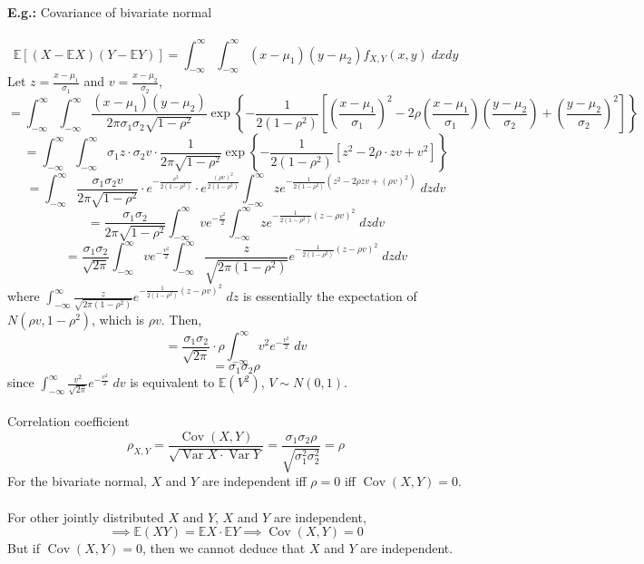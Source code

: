 \documentclass[a4paper]{article}
\newcommand{\n}{\hfill\break}
\newcommand{\eg}[1]{\par\noindent\settowidth{\hangindent}{\textbf{E.g.: }}\textbf{E.g.: }#1\n}
\newcommand{\Avg}{\mathbb{E}}
\newcommand{\E}{\Avg}
\DeclareMathOperator{\Var}{Var}
\DeclareMathOperator{\Cov}{Cov}
\begin{document}
\eg{
    Covariance of bivariate normal
    \\\\
    \[\E[(X-\E X)(Y-\E Y)]=\int_{-\infty}^\infty\int_{-\infty}^\infty (x-\mu_1)(y-\mu_2)f_{X,Y}(x,y)\;dxdy\]
    Let $z=\frac{x-\mu_1}{\sigma_1}$ and $v=\frac{x-\mu_2}{\sigma_2}$,
    \[=\int_{-\infty}^\infty\int_{-\infty}^\infty \frac{(x-\mu_1)(y-\mu_2)}{2\pi\sigma_1\sigma_2\sqrt{1-\rho^2}}\exp{\left\{-\frac{1}{2(1-\rho^2)}\left[\left(\frac{x-\mu_1}{\sigma_1}\right)^2-2\rho\left(\frac{x-\mu_1}{\sigma_1}\right)\left(\frac{y-\mu_2}{\sigma_2}\right)+\left(\frac{y-\mu_2}{\sigma_2}\right)^2\right]\right\}}\]
    \[=\int_{-\infty}^\infty\int_{-\infty}^\infty \sigma_1z\cdot\sigma_2v\cdot\frac{1}{2\pi\sqrt{1-\rho^2}}\exp\left\{-\frac{1}{2(1-\rho^2)}\left[z^2-2\rho\cdot zv+v^2\right]\right\}\]
    \[=\int_{-\infty}^\infty\frac{\sigma_1\sigma_2v}{2\pi\sqrt{1-\rho^2}}\cdot e^{-\frac{v^2}{2(1-\rho^2)}}\cdot e^{\frac{(\rho v)^2}{2(1-\rho^2)}}\int_{-\infty}^\infty ze^{-\frac{1}{2(1-\rho^2)}(z^2-2\rho zv+(\rho v)^2)}\;dzdv\]
    \[=\frac{\sigma_1\sigma_2}{2\pi\sqrt{1-\rho^2}}\int_{-\infty}^\infty ve^{-\frac{v^2}{2}}\int_{-\infty}^\infty ze^{-\frac{1}{2(1-\rho^2)}(z-\rho v)^2}\;dzdv\]
    \[=\frac{\sigma_1\sigma_2}{\sqrt{2\pi}}\int_{-\infty}^\infty ve^{-\frac{v^2}{2}}\int_{-\infty}^\infty \frac{z}{\sqrt{2\pi(1-\rho^2)}}e^{-\frac{1}{2(1-\rho^2)}(z-\rho v)^2}\;dzdv\]
    where $\int_{-\infty}^\infty \frac{z}{\sqrt{2\pi(1-\rho^2)}}e^{-\frac{1}{2(1-\rho^2)}(z-\rho v)^2}\;dz$ is essentially the expectation of $N(\rho v, 1-\rho^2)$, which is $\rho v$. Then, 
    \[=\frac{\sigma_1\sigma_2}{\sqrt{2\pi}}\cdot\rho\int_{-\infty}^\infty v^2e^{-\frac{v^2}{2}}\;dv\]
    \[=\sigma_1\sigma_2\rho\]
    since $\int_{-\infty}^\infty \frac{v^2}{\sqrt{2\pi}}e^{-\frac{v^2}{2}}\;dv$ is equivalent to $\E(V^2)$, $V\sim N(0,1)$.
    \\\\
    Correlation coefficient
    \[\rho_{X,Y}=\frac{\Cov(X,Y)}{\sqrt{\Var X\cdot\Var Y}}=\frac{\sigma_1\sigma_2\rho}{\sqrt{\sigma_1^2\sigma_2^2}}=\rho\]
    For the bivariate normal, $X$ and $Y$ are independent iff $\rho=0$ iff $\Cov(X,Y)=0$.
    \\\\
    For other jointly distributed $X$ and $Y$, $X$ and $Y$ are independent,
    \[\implies\E(XY)=\E X\cdot\E Y\implies\Cov(X,Y)=0\]
    But if $\Cov(X,Y)=0$, then we cannot deduce that $X$ and $Y$ are independent.
}
\end{document}
